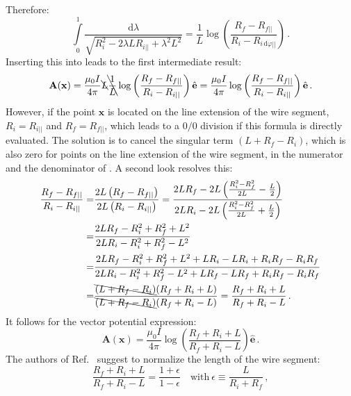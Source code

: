 Therefore:
\begin{equation}
 \int\limits_0^1 \frac{\mathrm{d}\lambda}{\sqrt{R_i^2 - 2 \lambda L R_{i ||} + \lambda^2 L^2}}
 = \frac{1}{L} \log \left( \frac{ R_f - R_{f ||} }{ R_i - R_{i  \,\mathrm{d}\varphi||} } \right) \, .
\end{equation}
Inserting this into  leads to the first intermediate result:
\begin{equation}
   \mathbf{A}(\mathbf{x})
 = \frac{\mu_0 I}{4 \pi} \bcancel{L} \bcancel{\frac{1}{L}} \log \left( \frac{ R_f - R_{f ||} }{ R_i - R_{i ||} } \right) \hat{\mathbf{e}}
 = \frac{\mu_0 I}{4 \pi}                                   \log \left( \frac{ R_f - R_{f ||} }{ R_i - R_{i ||} } \right) \hat{\mathbf{e}} \, . \label{eqn:A_first}
\end{equation}
However, if the point $\mathbf{x}$ is located on the line extension of the wire segment, $R_i = R_{i ||}$ and $R_f = R_{f ||}$,
which leads to a $0/0$ division if this formula is directly evaluated.
The solution is to cancel the singular term $(L + R_f - R_i)$, which is also zero for points on the line extension of the wire segment,
in the numerator and the denominator of .
A second look resolves this:
\begin{align}
\frac{ R_f - R_{f ||} }{ R_i - R_{i ||} }
 = & \frac{ 2 L \left( R_f - R_{f ||} \right) }{ 2 L \left( R_i - R_{i ||} \right) }
 =   \frac{ 2 L R_f - 2 L \left( \frac{R_i^2 - R_f^2}{2 L} - \frac{L}{2} \right) }{ 2 L R_i - 2 L \left( \frac{R_i^2 - R_f^2}{2 L} + \frac{L}{2} \right) } \\
 = & \frac{ 2 L R_f - R_i^2 + R_f^2 + L^2 }{ 2 L R_i - R_i^2 + R_f^2 - L^2 } \\
 = & \frac{ 2 L R_f - R_i^2 + R_f^2 + L^2 + L R_i - L R_i + R_i R_f - R_i R_f}{ 2 L R_i - R_i^2 + R_f^2 - L^2 + L R_f - L R_f + R_i R_f - R_i R_f } \\
 = & \frac{\bcancel{(L + R_f - R_i)}(R_f + R_i + L)}{\bcancel{(L + R_f - R_i)}(R_f + R_i - L)}
 =   \frac{R_f + R_i + L}{R_f + R_i - L} \, .
\end{align}
It follows for the vector potential expression:
\begin{equation}
 \mathbf{A}(\mathbf{x}) = \frac{\mu_0 I}{4 \pi} \log \left( \frac{R_f + R_i + L}{R_f + R_i - L} \right) \hat{\mathbf{e}} \, . \label{eqn:A_second}
\end{equation}
The authors of Ref.~\cite{hanson_hirshman_2002} suggest to normalize the length of the wire segment:
\begin{equation}
 \frac{R_f + R_i + L}{R_f + R_i - L} = \frac{1 + \epsilon}{1 - \epsilon} \quad \mathrm{with} ~ \epsilon \equiv \frac{L}{R_i + R_f} \, ,
\end{equation}
